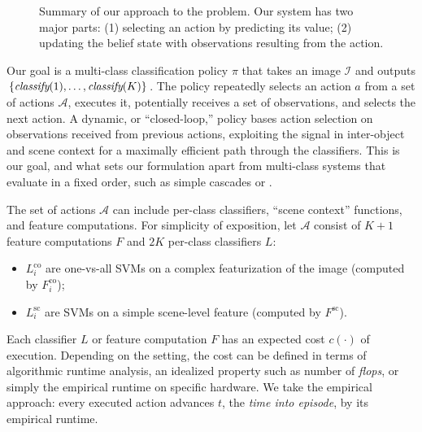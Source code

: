 \documentclass[runningheads]{llncs}
\begin{document}
\begin{figure}[h!]
  \caption{Summary of our approach to the problem. Our system has two major parts: (1) selecting an action by predicting its value; (2) updating the belief state with observations resulting from the action.}
  \label{fig:evaluation}
\end{figure}

Our goal is a multi-class classification policy $\pi$ that takes an image $\mathcal{I}$ and outputs $\{\emph{classify}(1), \dots, \emph{classify}(K)\}$.
The policy repeatedly selects an action $a$ from a set of actions $\mathcal{A}$, executes it, potentially receives a set of observations, and selects the next action.
A dynamic, or ``closed-loop,'' policy bases action selection on observations received from previous actions, exploiting the signal in inter-object and scene context for a maximally efficient path through the classifiers.
This is our goal, and what sets our formulation apart from multi-class systems that evaluate in a fixed order, such as simple cascades \cite{Viola2001} or .

The set of actions $\mathcal{A}$ can include per-class classifiers, ``scene context'' functions, and feature computations.
For simplicity of exposition, let $\mathcal{A}$ consist of $K+1$ feature computations $F$ and $2K$ per-class classifiers $L$:
\begin{itemize}
	\item $L^\text{co}_i$ are one-vs-all SVMs on a complex featurization of the image (computed by $F^\text{co}_i$);
	\item $L^\text{sc}_i$ are SVMs on a simple scene-level feature (computed by $F^\text{sc}$).
\end{itemize}


Each classifier $L$ or feature computation $F$ has an expected cost $c(\cdot)$ of execution.
Depending on the setting, the cost can be defined in terms of algorithmic runtime analysis, an idealized property such as number of \emph{flops}, or simply the empirical runtime on specific hardware.
We take the empirical approach: every executed action advances $t$, the \emph{time into episode}, by its empirical runtime.
\end{document}
